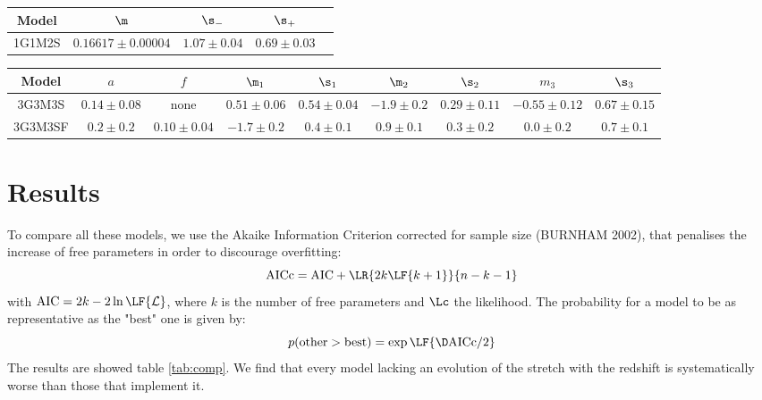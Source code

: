 \documentclass[bibnumber]{aa}
\begin{document}
\begin{table}[htbp!]
\begin{tabular}{c c c c c}
    Model & $\m$ & $\s_-$ & $\s_+$ \\\hline

    1G1M2S & $0.16617 \pm 0.00004$ & $1.07 \pm 0.04$ & $0.69 \pm 0.03$ \\\hline

\end{tabular} \bigbreak

\begin{tabular}{c c c c c c c c c}\hline\hline

    Model & $a$ & $f$ & $\m_1$ & $\s_1$ & $\m_2$ & $\s_2$ &
    $m_3$ & $\s_3$ \\\hline

    3G3M3S & $0.14 \pm 0.08$ & none & $0.51 \pm 0.06$ & $0.54 \pm 0.04$ & $-1.9
    \pm 0.2$ & $0.29 \pm 0.11$ & $-0.55 \pm 0.12$ & $0.67 \pm 0.15$ \\
    
    3G3M3SF & $0.2 \pm 0.2 $ & $0.10 \pm 0.04 $ & $-1.7 \pm 0.2$ & $0.4 \pm 0.1$
            & $0.9 \pm 0.1$ & $0.3 \pm 0.2$ & $0.0 \pm 0.2$ & $0.7 \pm 0.1$
            \\\hline

\end{tabular} \bigbreak

\end{table}

\section{Results}
To compare all these models, we use the Akaike Information Criterion corrected
for sample size (BURNHAM 2002), that penalises the increase of free parameters
in order to discourage overfitting:
\begin{equation}
    \mathrm{AICc} = \mathrm{AIC} + \LR{2k\LF{k+1}}{n - k - 1}
\end{equation}
with $\mathrm{AIC} = 2k - 2\ln\LF{\mathcal{L}}$, where $k$ is the number of free
parameters and $\Lc$ the likelihood. The probability for a model to be as
representative as the "best" one is given by:
\begin{equation}
    p(\mathrm{other} > \mathrm{best}) = \exp\LF{\D\mathrm{AICc}/2}
\end{equation}
The results are showed table \ref{tab:comp}. We find that every model lacking an
evolution of the stretch with the redshift is systematically worse than those
that implement it.
\end{document}
